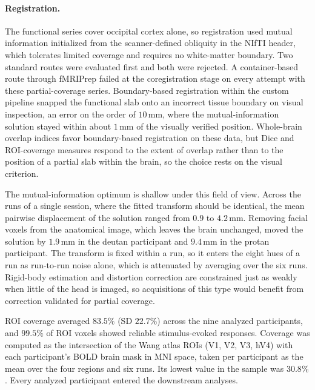 \paragraph{Registration.}
The functional series cover occipital cortex alone, so registration used mutual information initialized from the scanner-defined obliquity in the NIfTI header, which tolerates limited coverage and requires no white-matter boundary. Two standard routes were evaluated first and both were rejected. A container-based route through fMRIPrep failed at the coregistration stage on every attempt with these partial-coverage series. Boundary-based registration within the custom pipeline snapped the functional slab onto an incorrect tissue boundary on visual inspection, an error on the order of $10$\,mm, where the mutual-information solution stayed within about $1$\,mm of the visually verified position. Whole-brain overlap indices favor boundary-based registration on these data, but Dice and ROI-coverage measures respond to the extent of overlap rather than to the position of a partial slab within the brain, so the choice rests on the visual criterion.

The mutual-information optimum is shallow under this field of view. Across the runs of a single session, where the fitted transform should be identical, the mean pairwise displacement of the solution ranged from $0.9$ to $4.2$\,mm. Removing facial voxels from the anatomical image, which leaves the brain unchanged, moved the solution by $1.9$\,mm in the deutan participant and $9.4$\,mm in the protan participant. The transform is fixed within a run, so it enters the eight hues of a run as run-to-run noise alone, which is attenuated by averaging over the six runs. Rigid-body estimation and distortion correction are constrained just as weakly when little of the head is imaged, so acquisitions of this type would benefit from correction validated for partial coverage.




ROI coverage averaged $83.5\%$ (SD $22.7\%$) across the nine analyzed participants, and $99.5\%$ of ROI voxels showed reliable stimulus-evoked responses. Coverage was computed as the intersection of the Wang atlas ROIs (V1, V2, V3, hV4) with each participant's BOLD brain mask in MNI space, taken per participant as the mean over the four regions and six runs. Its lowest value in the sample was $30.8\%$. Every analyzed participant entered the downstream analyses.


